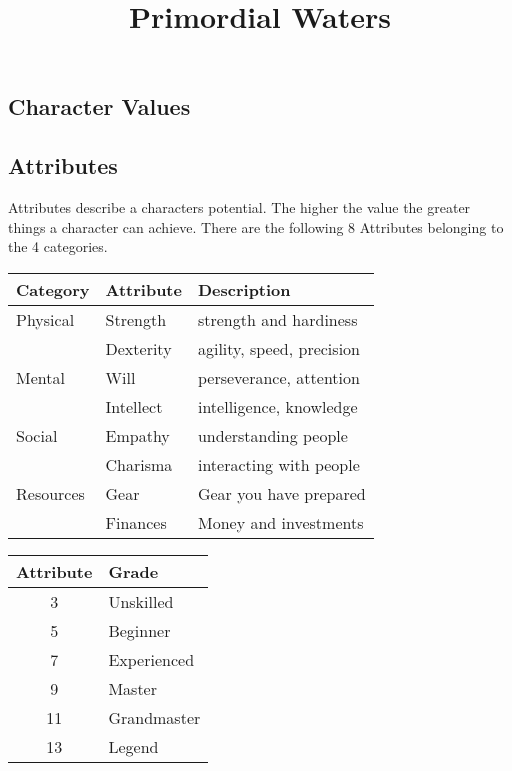 \documentclass[11pt]{article}
\date{}
\title{Primordial Waters}
\begin{document}
\maketitle
{

\begin{multicols}{2}[]


\section{Character Values}
\label{sec:org4acdefa}
\subsection{Attributes}
\label{sec:orgc208b15}
Attributes describe a characters potential. The higher the value the greater things a character can achieve. There are the following 8 Attributes belonging to the 4 categories.

\begin{center}
\begin{tabular}{lll}
\textbf{Category} & \textbf{Attribute} & \textbf{Description}\\
\hline
Physical & Strength & strength and hardiness\\
 & Dexterity & agility, speed, precision\\
\hline
Mental & Will & perseverance, attention\\
 & Intellect & intelligence, knowledge\\
\hline
Social & Empathy & understanding people\\
 & Charisma & interacting with people\\
\hline
Resources & Gear & Gear you have prepared\\
 & Finances & Money and investments\\
\end{tabular}
\end{center}

\begin{center}
\begin{tabular}{c|l}
\textbf{Attribute} & \textbf{Grade}\\
\hline
3 & Unskilled\\
5 & Beginner\\
7 & Experienced\\
9 & Master\\
11 & Grandmaster\\
13 & Legend\\
\end{tabular}
\end{center}


\end{multicols}}
\end{document}
